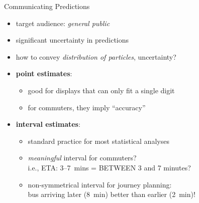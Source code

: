 \documentclass[10pt,t]{beamer}
\begin{document}
\begin{frame}{Communicating Predictions}
  \onslide<+->

  \begin{itemize}[<+->]

  \item target audience: \emph{general public}
    
  \item significant uncertainty in predictions

  \item how to convey \emph{distribution of particles}, uncertainty?

  \item \textbf{point estimates}:
    \begin{itemize}[<1->]
    \item good for displays that can only fit a single digit
    \item for commuters, they imply ``accuracy''
    \end{itemize}
    
  \item \textbf{interval estimates}:
    \begin{itemize}[<1->]
    \item standard practice for most statistical analyses
    \item \emph{meaningful} interval for commuters?\\
      i.e., ETA: 3--7~mins = BETWEEN 3 and 7 minutes?
    \item non-symmetrical interval for journey planning:\\
      bus arriving later (8~min) better than earlier (2~min)!
    \end{itemize}
  \end{itemize}

\end{frame}
\end{document}
